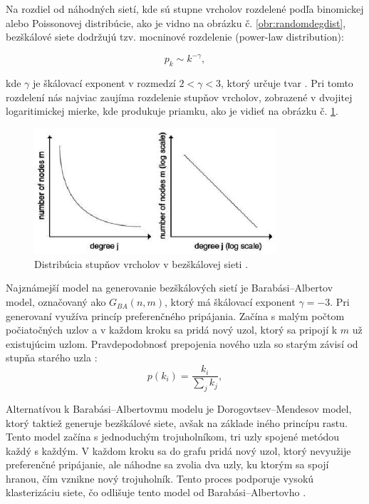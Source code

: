Na rozdiel od náhodných sietí, kde sú stupne vrcholov rozdelené podľa binomickej alebo Poissonovej distribúcie, ako je vidno na obrázku č. \ref{obr:randomdegdist},
bezškálové siete dodržujú tzv. mocninové rozdelenie (power-law distribution):

\begin{equation}
    p_k \sim k^{-\gamma},
    \label{eq:power_law_distribution_scale_free}
\end{equation}

kde $\gamma$ je škálovací exponent v rozmedzí $2 < \gamma < 3$, ktorý určuje tvar \cite{barabasi2016network}. Pri tomto rozdelení nás najviac zaujíma
rozdelenie stupňov vrcholov, zobrazené v dvojitej logaritimickej mierke, kde produkuje priamku, ako je vidieť na obrázku č. \ref{obr:powerlaw}.

\begin{figure}
    \centerline{\includegraphics[width=0.8\textwidth]{images/powerlaw.png}}
    \caption[Distribúcia stupňov vrcholov v bezškálovej sieti.]{Distribúcia stupňov vrcholov v bezškálovej sieti \cite{inproceedings}.}
    \label{obr:powerlaw}
\end{figure}

Najznámejší model na generovanie bezškálových sietí je Barabási–Albertov model, označovaný ako $G_{BA}(n, m)$, ktorý má
škálovací exponent $\gamma = -3$. Pri generovaní využíva princíp preferenčného pripájania. Začína s malým počtom počiatočných uzlov a v každom kroku sa pridá nový uzol,
ktorý sa pripojí k $m$ už existujúcim uzlom. Pravdepodobnosť prepojenia nového uzla so starým závisí od stupňa starého uzla \cite{barabasi2016network}:
\begin{equation}
    p(k_i) = \frac{k_i}{\sum_j k_j},
    \label{eq:preferential_attachment}
\end{equation}

Alternatívou k Barabási–Albertovmu modelu je Dorogovtsev–Mendesov model, ktorý taktiež generuje bezškálové siete, avšak na základe iného princípu rastu.
Tento model začína s jednoduchým trojuholníkom, tri uzly spojené metódou každý s každým. V každom kroku sa do grafu pridá nový uzol, ktorý nevyužije preferenčné
pripájanie, ale náhodne sa zvolia dva uzly, ku ktorým sa spojí hranou, čím vznikne nový trojuholník. Tento proces podporuje vysokú klasterizáciu siete,
čo odlišuje tento model od Barabási–Albertovho \cite{dorogovtsev2002evolution}. 

